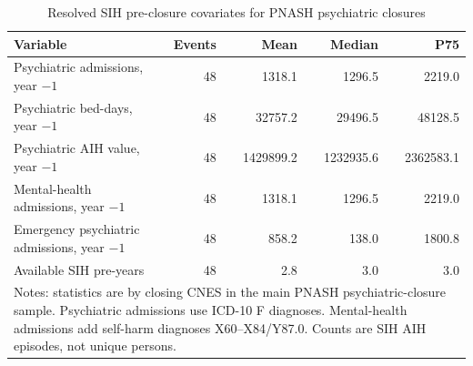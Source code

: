 \begin{table}[!htbp]\centering
\caption{Resolved SIH pre-closure covariates for PNASH psychiatric closures}
\label{tab:preclosure-sih-covariates}
\small
\begin{tabular}{lrrrr}
\toprule
Variable & Events & Mean & Median & P75 \\
\midrule
Psychiatric admissions, year $-1$ & 48 & 1318.1 & 1296.5 & 2219.0 \\
Psychiatric bed-days, year $-1$ & 48 & 32757.2 & 29496.5 & 48128.5 \\
Psychiatric AIH value, year $-1$ & 48 & 1429899.2 & 1232935.6 & 2362583.1 \\
Mental-health admissions, year $-1$ & 48 & 1318.1 & 1296.5 & 2219.0 \\
Emergency psychiatric admissions, year $-1$ & 48 & 858.2 & 138.0 & 1800.8 \\
Available SIH pre-years & 48 & 2.8 & 3.0 & 3.0 \\
\bottomrule
\multicolumn{5}{p{0.86\textwidth}}{\footnotesize Notes: statistics are by closing CNES in the main PNASH psychiatric-closure sample. Psychiatric admissions use ICD-10 F diagnoses. Mental-health admissions add self-harm diagnoses X60--X84/Y87.0. Counts are SIH AIH episodes, not unique persons.}\\
\end{tabular}
\end{table}
